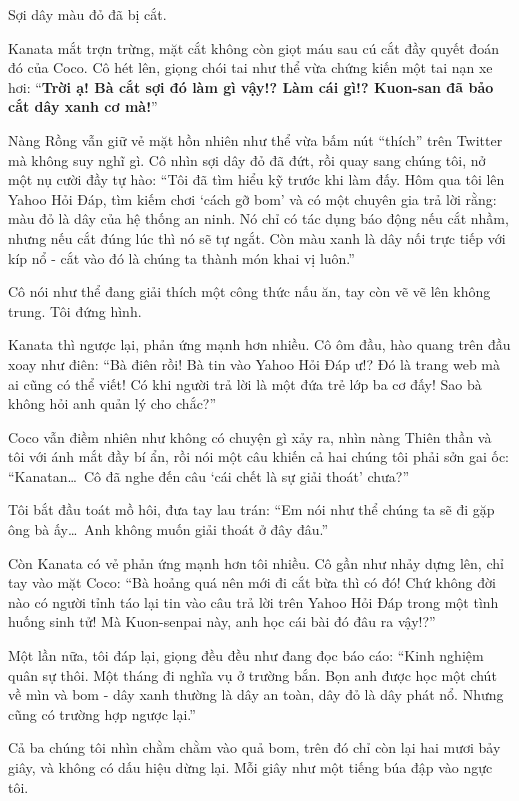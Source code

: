 \documentclass[../main.tex]{subfiles}
\begin{document}

Sợi dây màu đỏ đã bị cắt.

Kanata mắt trợn trừng, mặt cắt không còn giọt máu sau cú cắt đầy quyết đoán đó của Coco. Cô hét lên, giọng chói tai như thể vừa chứng kiến một tai nạn xe hơi: ``\textbf{Trời ạ! Bà cắt sợi đó làm gì vậy!? Làm cái gì!? Kuon-san đã bảo cắt dây xanh cơ mà!}''

Nàng Rồng vẫn giữ vẻ mặt hồn nhiên như thể vừa bấm nút ``thích'' trên Twitter mà không suy nghĩ gì. Cô nhìn sợi dây đỏ đã đứt, rồi quay sang chúng tôi, nở một nụ cười đầy tự hào: ``Tôi đã tìm hiểu kỹ trước khi làm đấy. Hôm qua tôi lên Yahoo Hỏi Đáp, tìm kiếm chơi `cách gỡ bom' và có một chuyên gia trả lời rằng: màu đỏ là dây của hệ thống an ninh. Nó chỉ có tác dụng báo động nếu cắt nhầm, nhưng nếu cắt đúng lúc thì nó sẽ tự ngắt. Còn màu xanh là dây nối trực tiếp với kíp nổ - cắt vào đó là chúng ta thành món khai vị luôn.''

Cô nói như thể đang giải thích một công thức nấu ăn, tay còn vẽ vẽ lên không trung. Tôi đứng hình.

Kanata thì ngược lại, phản ứng mạnh hơn nhiều. Cô ôm đầu, hào quang trên đầu xoay như điên: ``Bà điên rồi! Bà tin vào Yahoo Hỏi Đáp ư!? Đó là trang web mà ai cũng có thể viết! Có khi người trả lời là một đứa trẻ lớp ba cơ đấy! Sao bà không hỏi anh quản lý cho chắc?''

Coco vẫn điềm nhiên như không có chuyện gì xảy ra, nhìn nàng Thiên thần và tôi với ánh mắt đầy bí ẩn, rồi nói một câu khiến cả hai chúng tôi phải sởn gai ốc: ``Kanatan\dots\ Cô đã nghe đến câu `cái chết là sự giải thoát' chưa?''

Tôi bắt đầu toát mồ hôi, đưa tay lau trán: ``Em nói như thể chúng ta sẽ đi gặp ông bà ấy\dots\ Anh không muốn giải thoát ở đây đâu.''

Còn Kanata có vẻ phản ứng mạnh hơn tôi nhiều. Cô gần như nhảy dựng lên, chỉ tay vào mặt Coco: ``Bà hoảng quá nên mới đi cắt bừa thì có đó! Chứ không đời nào có người tỉnh táo lại tin vào câu trả lời trên Yahoo Hỏi Đáp trong một tình huống sinh tử! Mà Kuon-senpai này, anh học cái bài đó đâu ra vậy!?''

Một lần nữa, tôi đáp lại, giọng đều đều như đang đọc báo cáo: ``Kinh nghiệm quân sự thôi. Một tháng đi nghĩa vụ ở trường bắn. Bọn anh được học một chút về mìn và bom - dây xanh thường là dây an toàn, dây đỏ là dây phát nổ. Nhưng cũng có trường hợp ngược lại.''

Cả ba chúng tôi nhìn chằm chằm vào quả bom, trên đó chỉ còn lại hai mươi bảy giây, và không có dấu hiệu dừng lại. Mỗi giây như một tiếng búa đập vào ngực tôi.
\end{document}

